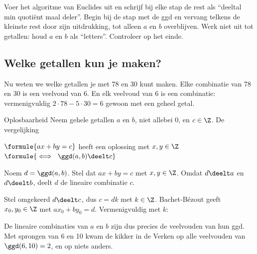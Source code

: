 \begin{werkwijze}
Voer het algoritme van Euclides uit en schrijf bij elke stap de rest als ``deeltal min quotiënt maal deler''. Begin bij de stap met de ggd en vervang telkens de kleinste rest door zijn uitdrukking, tot alleen $a$ en $b$ overblijven. Werk niet uit tot getallen: houd $a$ en $b$ als ``letters''. Controleer op het einde.
\end{werkwijze}


\begin{oefeningen}
\end{oefeningen}

\subsection{Welke getallen kun je maken?}

Nu weten we welke getallen je met 78 en 30 kunt maken. Elke combinatie van 78 en 30 is een veelvoud van 6. En elk veelvoud van 6 is een combinatie: vermenigvuldig $2 \cdot 78 - 5 \cdot 30 = 6$ gewoon met een geheel getal.

\begin{theorie}
\begin{stelling}{Oplosbaarheid}
Neem gehele getallen $a$ en $b$, niet allebei 0, en $c \in \Z$. De vergelijking

\vspace{1mm}
\qquad $\formule{ax + by = c}$ \qquad heeft een oplossing met $x, y \in \Z$ \quad $\formule{\iff \ \ggd(a, b) \deelt c}$
\end{stelling}

\begin{bewijs}
Noem $d = \ggd(a, b)$. Stel dat $ax + by = c$ met $x, y \in \Z$. Omdat $d \deelt a$ en $d \deelt b$, deelt $d$ de lineaire combinatie $c$.

Stel omgekeerd $d \deelt c$, dus $c = dk$ met $k \in \Z$. Bachet-Bézout geeft $x_0, y_0 \in \Z$ met $ax_0 + by_0 = d$. Vermenigvuldig met $k$:
\end{bewijs}
\end{theorie}

De lineaire combinaties van $a$ en $b$ zijn dus precies de veelvouden van hun ggd. Met sprongen van 6 en 10 kwam de kikker in de Verken op alle veelvouden van $\ggd(6, 10) = 2$, en op niets anders.

